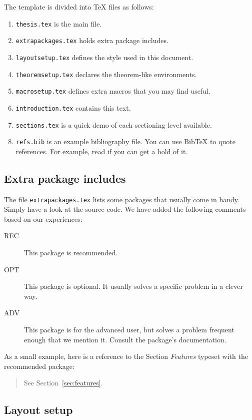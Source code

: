 The template is divided into \TeX{} files as follows:
\begin{enumerate}
\item \texttt{thesis.tex} is the main file.
\item \texttt{extrapackages.tex} holds extra package includes.
\item \texttt{layoutsetup.tex} defines the style used in this document.
\item \texttt{theoremsetup.tex} declares the theorem-like environments.
\item \texttt{macrosetup.tex} defines extra macros that you may find
  useful.
\item \texttt{introduction.tex} contains this text.
\item \texttt{sections.tex} is a quick demo of each sectioning level
  available.
\item \texttt{refs.bib} is an example bibliography file.  You can use
  Bib\TeX{} to quote references.  For example, read
  \cite{bringhurst1996ets} if you can get a hold of it.
\end{enumerate}


\subsection{Extra package includes}

The file \texttt{extrapackages.tex} lists some packages that usually
come in handy.  Simply have a look at the source code.  We have
added the following comments based on our experiences:
\begin{description}
\item[REC] This package is recommended.
\item[OPT] This package is optional.  It usually solves a specific
  problem in a clever way.
\item[ADV] This package is for the advanced user, but solves a problem
  frequent enough that we mention it. Consult the package's
  documentation.
\end{description}

As a small example, here is a reference to the Section \emph{Features}
typeset with the recommended  package:
\begin{quote}
  See Section~\vref{sec:features}.
\end{quote}


\subsection{Layout setup}


